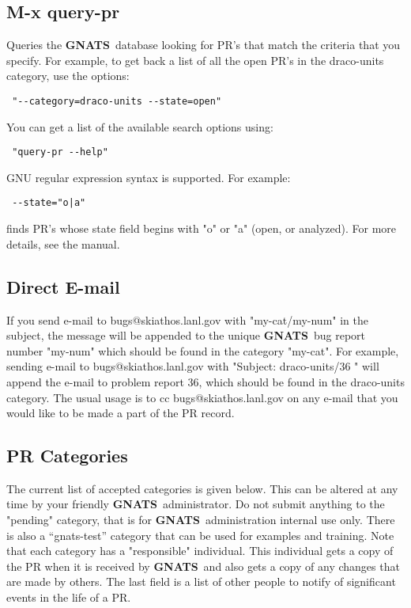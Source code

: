 \documentclass[11pt]{nmemo}
\newcommand{\gnats}{{\normalfont\bfseries GNATS}}
\begin{document}
\subsection{M-x query-pr }
Queries the \gnats\ database looking for PR's that match the criteria
that you specify. For example, to get back a list of all the open PR's
in the draco-units category, use the options:
\begin{verbatim} "--category=draco-units --state=open" \end{verbatim}
 You can get a list of the available search options using: 
\begin{verbatim} "query-pr --help" \end{verbatim}
GNU regular expression syntax is supported.
For example: \begin{verbatim} --state="o|a" \end{verbatim}
finds PR's whose state field begins
with "o" or "a" (open, or analyzed). For more details, see the manual.

\subsection{Direct E-mail }
If you send e-mail to bugs@skiathos.lanl.gov with
"my-cat/my-num" in the subject, the message will be appended to
the unique \gnats\ bug report number "my-num" which should
be found in the category "my-cat". 
For example, sending e-mail to
bugs@skiathos.lanl.gov with "Subject: draco-units/36 " will
append the e-mail to problem report 36, which should be found in the 
draco-units category.
The usual usage is to cc bugs@skiathos.lanl.gov on any e-mail that
you would like to be made a part of the PR record.

\subsection {PR Categories}
The current list of accepted categories is given below. This can be altered 
at any time by your friendly \gnats\ administrator.
Do not submit anything to the "pending" category, that is for
\gnats\ administration internal use only. There is also a ``gnats-test''
category that can be used for examples and training.
Note that each category has a "responsible" individual.  This
individual gets a copy of the PR when it is received by \gnats\, and also
gets a copy of any changes that are made by others. The last field is
a list of other people to notify of significant events in the life
of a PR.
\end{document}
